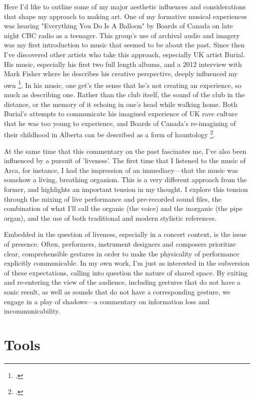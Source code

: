\documentclass[12pt,twoside,maitrise]{dms_ks}
\theoremstyle{definition}
\begin{document}
Here I'd like to outline some of my major aesthetic influences and considerations that shape my approach to making art. 
One of my formative musical experiences was hearing "Everything You Do Is A Balloon" by Boards of Canada on late night CBC radio as a teenager. 
This group's use of archival audio and imagery was my first introduction to music that seemed to be about the past. 
Since then I've discovered other artists who take this approach, especially UK artist Burial. 
His music, especially his first two full length albums, and a 2012 interview with Mark Fisher where he describes his creative perspective, deeply influenced my own \footcite{fisher_burial_2012}. 
In his music, one get's the sense that he's not creating an experience, so much as describing one. 
Rather than the club itself, the sound of the club in the distance, or the memory of it echoing in one's head while walking home. 
Both Burial's attempts to communicate his imagined experience of UK rave culture that he was too young to experience, and Boards of Canada's re-imagining of their childhood in Alberta can be described as a form of hauntology \footcite{alary_vers_2020}.

At the same time that this commentary on the past fascinates me, I've also been influenced by a pursuit of 'liveness'. 
The first time that I listened to the music of Arca, for instance, I had the impression of an immediacy---that the music was somehow a living, breathing organism. 
This is a very different approach from the former, and highlights an important tension in my thought. 
I explore this tension through the mixing of live performance and pre-recorded sound files, the combination of what I'll call the organic (the voice) and the inorganic (the pipe organ), and the use of both traditional and modern stylistic references.

Embedded in the question of liveness, especially in a concert context, is the issue of presence. 
Often, performers, instrument designers and composers prioritize clear, comprehensible gestures in order to make the physicality of performance explicitly communicable. 
In my own work, I'm just as interested in the subversion of these expectations, calling into question the nature of shared space. 
By exiting and re-entering the view of the audience, including gestures that do not have a sonic result, as well as sounds that do not have a corresponding gesture, we engage in a play of shadows---a commentary on information loss and incommunicability. 

\section{Tools}
\end{document}
